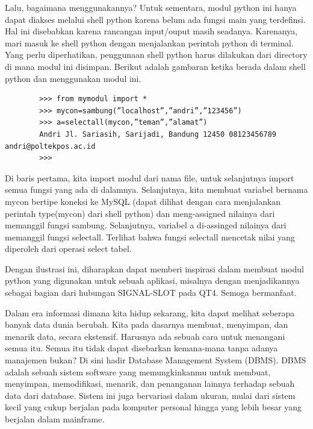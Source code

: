Lalu, bagaimana menggunakannya? Untuk sementara, modul python ini hanya dapat diakses melalui shell python karena belum ada fungsi main yang terdefinsi. Hal ini disebabkan karena rancangan input/ouput masih seadanya. Karenanya, mari masuk ke shell python dengan menjalankan perintah python di terminal. Yang perlu diperhatikan, penggunaan shell python harus dilakukan dari directory di mana modul ini disimpan. Berikut adalah gambaran ketika berada dalam shell python dan menggunakan modul ini. 

	\begin{verbatim}
		>>> from mymodul import * 
		>>> mycon=sambung(”localhost”,”andri”,”123456”) 
		>>> a=selectall(mycon,”teman”,”alamat”) 
		Andri Jl. Sariasih, Sarijadi, Bandung 12450 08123456789 andri@poltekpos.ac.id 
		>>> 
	\end{verbatim}
	
Di baris pertama, kita import modul dari nama file, untuk selanjutnya import semua fungsi yang ada di dalamnya. Selanjutnya, kita membuat variabel bernama mycon bertipe koneksi ke MySQL (dapat dilihat dengan cara menjalankan perintah type(mycon) dari shell python) dan meng-assigned nilainya dari memanggil fungsi sambung. Selanjutnya, variabel a di-assinged nilainya dari memanggil fungsi selectall. Terlihat bahwa fungsi selectall mencetak nilai yang diperoleh dari operasi select tabel. 

Dengan ilustrasi ini, diharapkan dapat memberi inspirasi dalam membuat modul python yang digunakan untuk sebuah aplikasi, misalnya dengan menjadikannya sebagai bagian dari hubungan SIGNAL-SLOT pada QT4. Semoga bermanfaat. 

Dalam era informasi dimana kita hidup sekarang, kita dapat melihat seberapa banyak data dunia berubah. Kita pada dasarnya membuat, menyimpan, dan menarik data, secara ekstensif. Harusnya ada sebuah cara untuk menangani semua itu. Semua itu tidak dapat disebarkan kemana-mana tanpa adanya manajemen bukan? Di sini hadir Database Management System (DBMS). DBMS adalah sebuah sistem software yang memungkinkanmu untuk membuat, menyimpan, memodifikasi, menarik, dan penanganan lainnya terhadap sebuah data dari database. Sistem ini juga bervariasi dalam ukuran, mulai dari sistem kecil yang cukup berjalan pada komputer personal hingga yang lebih besar yang berjalan dalam mainframe. 

